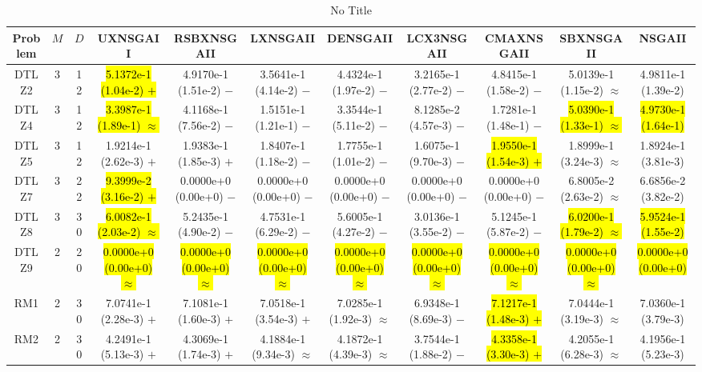 \documentclass[journal]{IEEEtran}
\begin{document}
\begin{table*}[htbp]
\renewcommand{\arraystretch}{1.2}
\centering
\caption{No Title}
\begin{tabular}{ccccccccccc}
\toprule
Problem&$M$&$D$&UXNSGAII&RSBXNSGAII&LXNSGAII&DENSGAII&LCX3NSGAII&CMAXNSGAII&SBXNSGAII&NSGAII\\
\midrule
\multirow{1}{*}{DTLZ2}&3&12&\hl{5.1372e-1 (1.04e-2) $+$}&4.9170e-1 (1.51e-2) $-$&3.5641e-1 (4.14e-2) $-$&4.4324e-1 (1.97e-2) $-$&3.2165e-1 (2.77e-2) $-$&4.8415e-1 (1.58e-2) $-$&5.0139e-1 (1.15e-2) $\approx$&4.9811e-1 (1.39e-2)\\
\hline
\multirow{1}{*}{DTLZ4}&3&12&\hl{3.3987e-1 (1.89e-1) $\approx$}&4.1168e-1 (7.56e-2) $-$&1.5151e-1 (1.21e-1) $-$&3.3544e-1 (5.11e-2) $-$&8.1285e-2 (4.57e-3) $-$&1.7281e-1 (1.48e-1) $-$&\hl{5.0390e-1 (1.33e-1) $\approx$}&\hl{4.9730e-1 (1.64e-1)}\\
\hline
\multirow{1}{*}{DTLZ5}&3&12&1.9214e-1 (2.62e-3) $+$&1.9383e-1 (1.85e-3) $+$&1.8407e-1 (1.18e-2) $-$&1.7755e-1 (1.01e-2) $-$&1.6075e-1 (9.70e-3) $-$&\hl{1.9550e-1 (1.54e-3) $+$}&1.8999e-1 (3.24e-3) $\approx$&1.8924e-1 (3.81e-3)\\
\hline
\multirow{1}{*}{DTLZ7}&3&22&\hl{9.3999e-2 (3.16e-2) $+$}&0.0000e+0 (0.00e+0) $-$&0.0000e+0 (0.00e+0) $-$&0.0000e+0 (0.00e+0) $-$&0.0000e+0 (0.00e+0) $-$&0.0000e+0 (0.00e+0) $-$&6.8005e-2 (2.63e-2) $\approx$&6.6856e-2 (3.82e-2)\\
\hline
\multirow{1}{*}{DTLZ8}&3&30&\hl{6.0082e-1 (2.03e-2) $\approx$}&5.2435e-1 (4.90e-2) $-$&4.7531e-1 (6.29e-2) $-$&5.6005e-1 (4.27e-2) $-$&3.0136e-1 (3.55e-2) $-$&5.1245e-1 (5.87e-2) $-$&\hl{6.0200e-1 (1.79e-2) $\approx$}&\hl{5.9524e-1 (1.55e-2)}\\
\hline
\multirow{1}{*}{DTLZ9}&2&20&\hl{0.0000e+0 (0.00e+0) $\approx$}&\hl{0.0000e+0 (0.00e+0) $\approx$}&\hl{0.0000e+0 (0.00e+0) $\approx$}&\hl{0.0000e+0 (0.00e+0) $\approx$}&\hl{0.0000e+0 (0.00e+0) $\approx$}&\hl{0.0000e+0 (0.00e+0) $\approx$}&\hl{0.0000e+0 (0.00e+0) $\approx$}&\hl{0.0000e+0 (0.00e+0)}\\
\hline
\multirow{1}{*}{RM1}&2&30&7.0741e-1 (2.28e-3) $+$&7.1081e-1 (1.60e-3) $+$&7.0518e-1 (3.54e-3) $+$&7.0285e-1 (1.92e-3) $\approx$&6.9348e-1 (8.69e-3) $-$&\hl{7.1217e-1 (1.48e-3) $+$}&7.0444e-1 (3.19e-3) $\approx$&7.0360e-1 (3.79e-3)\\
\hline
\multirow{1}{*}{RM2}&2&30&4.2491e-1 (5.13e-3) $+$&4.3069e-1 (1.74e-3) $+$&4.1884e-1 (9.34e-3) $\approx$&4.1872e-1 (4.39e-3) $\approx$&3.7544e-1 (1.88e-2) $-$&\hl{4.3358e-1 (3.30e-3) $+$}&4.2055e-1 (6.28e-3) $\approx$&4.1956e-1 (5.23e-3)\\

\end{tabular}
\end{table*}
\end{document}

